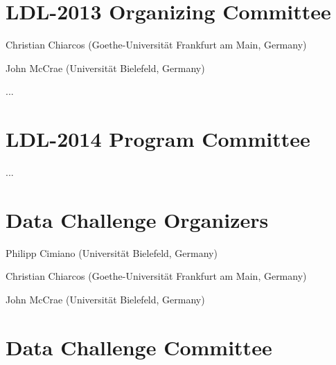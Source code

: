 \documentclass[10pt, a4paper]{article}
\begin{document}
\begin{figure*}
\begin{minipage}{\textwidth}
\section*{LDL-2013 Organizing Committee}

\smallskip

Christian Chiarcos (Goethe-Universität Frankfurt am Main, Germany)

John McCrae (Universität Bielefeld, Germany)

...

\bigskip

\section*{LDL-2014 Program Committee}

\smallskip

...

\pagebreak

\section*{Data Challenge Organizers}

\smallskip

Philipp Cimiano (Universität Bielefeld, Germany)

Christian Chiarcos (Goethe-Universität Frankfurt am Main, Germany)

John McCrae (Universität Bielefeld, Germany)

\bigskip

\section*{Data Challenge Committee}

\smallskip

\end{minipage}
\end{figure*}
\end{document}
